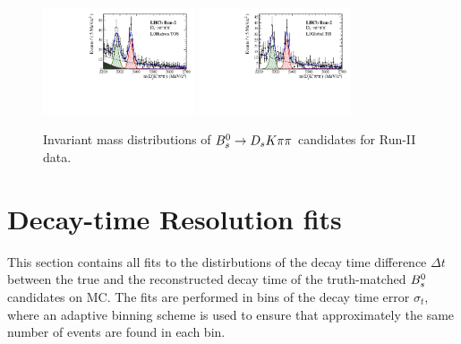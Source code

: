 \begin{figure}[h]
\includegraphics[height=!,width=0.4\textwidth]{figs/MassFit/signal_Run2_pipipi_t0.pdf}
\includegraphics[height=!,width=0.4\textwidth]{figs/MassFit/signal_Run2_pipipi_t1.pdf}

\caption{Invariant mass distributions of ${{B}^0_{s}}\rightarrow{\ensuremath{{D}_{s}}} K{\pi}{\pi}$ candidates for Run-II data.}
\label{fig:massfits_signal_Run2}
\end{figure}


\clearpage
\section{Decay-time Resolution fits}
\label{sec:DecResFits}

This section contains all fits to the distirbutions of the decay time difference $\Delta t$ between the true and the reconstructed decay time of the truth-matched ${{B}^0_{s}}$ candidates on MC.
The fits are performed in bins of the decay time error $\sigma_{t}$, where an adaptive binning scheme is used to ensure that approximately the same number of events are found in each bin. 

